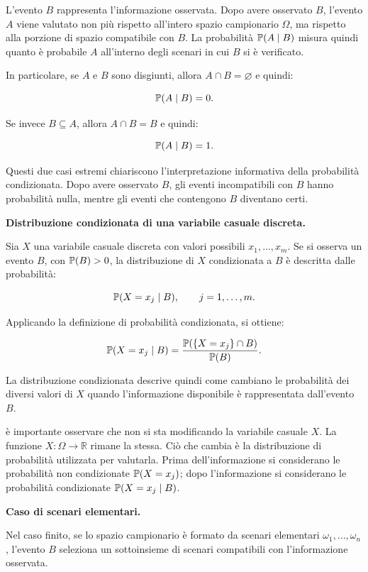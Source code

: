 L'evento $B$ rappresenta l'informazione osservata. Dopo avere osservato $B$, l'evento $A$ viene valutato non pi\`{u} rispetto all'intero spazio campionario $\Omega$, ma rispetto alla porzione di spazio compatibile con $B$. La probabilit\`{a} $\mathbb{P}(A\mid B)$ misura quindi quanto \`{e} probabile $A$ all'interno degli scenari in cui $B$ si \`{e} verificato.

In particolare, se $A$ e $B$ sono disgiunti, allora $A\cap B=\varnothing$ e quindi:

\[
\mathbb{P}(A\mid B)=0.
\]

Se invece $B\subseteq A$, allora $A\cap B=B$ e quindi:

\[
\mathbb{P}(A\mid B)=1.
\]

Questi due casi estremi chiariscono l'interpretazione informativa della probabilit\`{a} condizionata. Dopo avere osservato $B$, gli eventi incompatibili con $B$ hanno probabilit\`{a} nulla, mentre gli eventi che contengono $B$ diventano certi.

\medskip

\noindent
\textbf{Distribuzione condizionata di una variabile casuale discreta.}

Sia $X$ una variabile casuale discreta con valori possibili $x_1,\ldots,x_m$. Se si osserva un evento $B$, con $\mathbb{P}(B)>0$, la distribuzione di $X$ condizionata a $B$ \`{e} descritta dalle probabilit\`{a}:

\[
\mathbb{P}(X=x_j\mid B),
\qquad j=1,\ldots,m.
\]

Applicando la definizione di probabilit\`{a} condizionata, si ottiene:

\[
\mathbb{P}(X=x_j\mid B)
=
\frac{\mathbb{P}(\{X=x_j\}\cap B)}{\mathbb{P}(B)}.
\]

La distribuzione condizionata descrive quindi come cambiano le probabilit\`{a} dei diversi valori di $X$ quando l'informazione disponibile \`{e} rappresentata dall'evento $B$.

\`{e} importante osservare che non si sta modificando la variabile casuale $X$. La funzione $X:\Omega\to\mathbb{R}$ rimane la stessa. Ci\`{o} che cambia \`{e} la distribuzione di probabilit\`{a} utilizzata per valutarla. Prima dell'informazione si considerano le probabilit\`{a} non condizionate $\mathbb{P}(X=x_j)$; dopo l'informazione si considerano le probabilit\`{a} condizionate $\mathbb{P}(X=x_j\mid B)$.

\medskip

\noindent
\textbf{Caso di scenari elementari.}

Nel caso finito, se lo spazio campionario \`{e} formato da scenari elementari $\omega_1,\ldots,\omega_n$, l'evento $B$ seleziona un sottoinsieme di scenari compatibili con l'informazione osservata.

